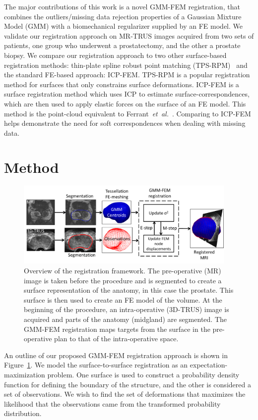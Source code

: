 \documentclass[journal]{IEEEtran}
\begin{document}
The major contributions of this work is a novel GMM-FEM registration, that combines the outliers/missing data rejection properties of a Gaussian Mixture Model (GMM) with a biomechanical regularizer supplied by an FE model. We validate our registration approach on MR-TRUS images acquired from two sets of patients, one group who underwent a prostatectomy, and the other a prostate biopsy. We compare our registration approach to two other surface-based registration methods: thin-plate spline robust point matching (TPS-RPM)~\cite{Chui03a} and the standard FE-based approach: ICP-FEM. TPS-RPM is a popular registration method for surfaces that only constrains surface deformations. ICP-FEM is a surface registration method which uses ICP to estimate surface-correspondences, which are then used to apply elastic forces on the surface of an FE model. This method is the point-cloud equivalent to Ferrant~\textit{et~al.}~\cite{Ferrant01a}. Comparing to ICP-FEM helps demonstrate the need for soft correspondences when dealing with missing data.

\section{Method}
\begin{figure}[t]
\center
\includegraphics[width = 0.95\textwidth]{flow1}
\caption{Overview of the registration framework. The pre-operative (MR) image is taken before the procedure and is segmented to create a surface representation of the anatomy, in this case the prostate. This surface is then used to create an FE model of the volume. At the beginning of the procedure, an intra-operative (3D-TRUS) image is acquired and parts of the anatomy (midgland) are segmented. The GMM-FEM registration maps targets from the surface in the pre-operative plan to that of the intra-operative space.}
\label{fig:flowchart}
\end{figure}
An outline of our proposed GMM-FEM registration approach is shown in Figure~\ref{fig:flowchart}. We model the surface-to-surface registration as an expectation-maximization problem.  One surface is used to construct a probability density function for defining the boundary of the structure, and the other is considered a set of observations.  We wish to find the set of deformations that maximizes the likelihood that the observations came from the transformed probability distribution.
\end{document}
